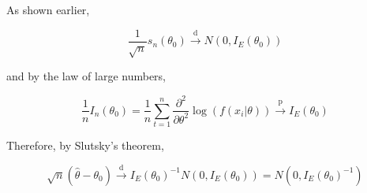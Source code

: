 \documentclass{article}
\begin{document}
As shown earlier,

\[
\frac{1}{\sqrt{n}} s_n(\theta_0)  \xrightarrow[]{\text{d}} N(0, I_E(\theta_0))
\]

and by the law of large numbers,

\[
\frac{1}{n} I_n(\theta_0) = \frac{1}{n} \sum_{t=1}^n \frac{\partial^2}{\partial\theta^2} \log(f(x_i|\theta))  \xrightarrow[]{\text{p}} I_E(\theta_0)
\]

Therefore, by Slutsky's theorem,

\[
\sqrt{n}(\hat{\theta} - \theta_0) \xrightarrow[]{\text{d}} I_E(\theta_0)^{-1} N(0, I_E(\theta_0)) = N(0, I_E(\theta_0)^{-1})
\]
\end{document}
